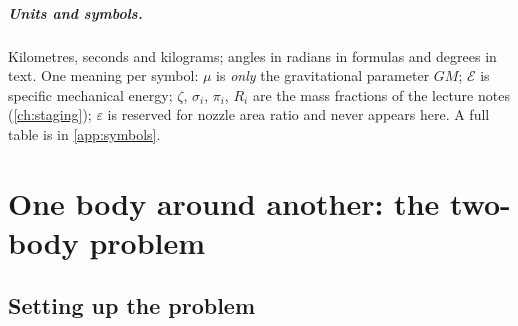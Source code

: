 \documentclass[11pt,letterpaper,oneside]{report}
\newcommand{\En}{\mathcal E}
\begin{document}
\paragraph{Units and symbols.} Kilometres, seconds and kilograms; angles in radians in formulas
and degrees in text. One meaning per symbol: $\mu$ is \emph{only} the gravitational parameter
$GM$; $\En$ is specific mechanical energy; $\zeta$, $\sigma_i$, $\pi_i$, $R_i$ are the mass
fractions of the lecture notes (\cref{ch:staging}); $\varepsilon$ is reserved for nozzle area
ratio and never appears here. A full table is in \cref{app:symbols}.

\tableofcontents

\chapter{One body around another: the two-body problem}\label{ch:twobody}

\section{Setting up the problem}\label{sec:setup}
\end{document}
